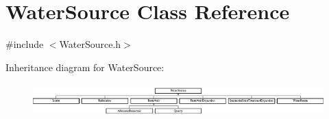 \hypertarget{classWaterSource}{}\section{Water\+Source Class Reference}
\label{classWaterSource}


{\ttfamily \#include $<$Water\+Source.\+h$>$}

Inheritance diagram for Water\+Source\+:\begin{figure}[H]
\begin{center}
\leavevmode
\includegraphics[height=1.284404cm]{classWaterSource}
\end{center}
\end{figure}
